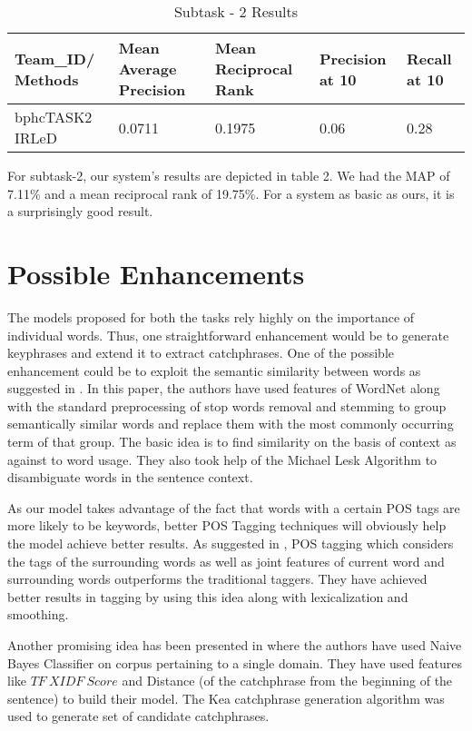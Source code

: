 \begin{table}[H]
\caption{Subtask - 2 Results}
\begin{tabularx}{\linewidth}{|L|L|L|L|L|}
    \hline
    Team\_ID/ Methods & Mean Average Precision & Mean Reciprocal Rank & Precision at 10 & Recall at 10 \\
    \hline
     bphcTASK2 IRLeD  & 0.0711 & 0.1975 & 0.06 & 0.28 \\
     \hline
\end{tabularx}

\end{table}
For subtask-2, our system's results are depicted in table 2. We had the MAP of 7.11\% and a mean reciprocal rank of 19.75\%. For a system as basic as ours, it is a surprisingly good result.
\section{Possible Enhancements}
The models proposed for both the tasks rely highly on the importance of individual words. Thus, one straightforward enhancement would be to generate keyphrases and extend it to extract catchphrases. One of the possible enhancement could be to exploit the semantic similarity between words as suggested in \cite{haggag2013keyword}. In this paper, the authors have used features of WordNet along with the standard preprocessing of stop words removal and stemming to group semantically similar words and replace them with the most commonly occurring term of that group. The basic idea is to find similarity on the basis of context as against to word usage. They also took help of the Michael Lesk Algorithm \cite{lesk1986automatic} to disambiguate words in the sentence context.\par
As our model takes advantage of the fact that words with a certain POS tags are more likely to be keywords, better POS Tagging techniques will obviously help the model achieve better results. As suggested in \cite{toutanova2003feature}, POS tagging which considers the tags of the surrounding words as well as joint features of current word and surrounding words outperforms the traditional taggers. They have achieved better results in tagging by using this idea along with lexicalization and smoothing.\par
Another promising idea has been presented in \cite{frank1999domain} where the authors have used Naive Bayes Classifier on corpus pertaining to a single domain. They have used features like \(TF\ X IDF\ Score\) and Distance (of the catchphrase from the beginning of the sentence) to build their model. The Kea catchphrase generation algorithm was used to generate set of candidate catchphrases.\par
